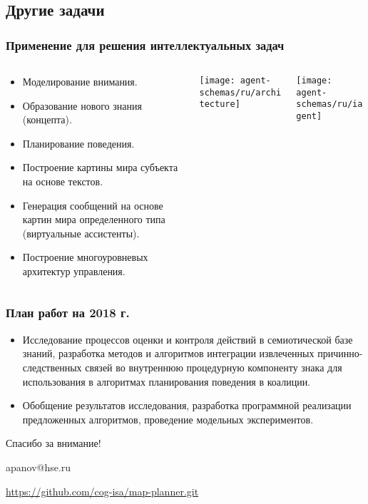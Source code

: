 \documentclass[default]{beamer}
\begin{document}
	\subsection{Другие задачи}
	\begin{frame}
		\frametitle{Применение для решения интеллектуальных задач}
		\vspace{-5pt}
		\footnotesize
		\begin{columns}
			\begin{column}{0.5\textwidth}
				\begin{itemize}
					\item Моделирование внимания.
					\item Образование нового знания (концепта).
					\item Планирование поведения.
					\item Построение картины мира субъекта на основе текстов.
					\item Генерация сообщений на основе картин мира определенного типа (виртуальные ассистенты).
					\item Построение многоуровневых архитектур управления.
				\end{itemize}
				
			\end{column}
			\begin{column}{0.35\textwidth}
				\texttt{[image: agent-schemas/ru/architecture]}
			\end{column}
			\begin{column}{0.15\textwidth}
				\texttt{[image: agent-schemas/ru/iagent]}
			\end{column}
			
		\end{columns}
		\vspace{-5pt}
		\nocite{*}
		\printbibliography[keyword={strl}, resetnumbers=true]
	\end{frame}

	\begin{frame}
		\frametitle{План работ на 2018 г.}
		
		\begin{itemize}
			\item Исследование процессов оценки и контроля действий в семиотической базе знаний, разработка методов и алгоритмов интеграции извлеченных причинно-следственных связей во внутреннюю процедурную компоненту знака для использования в алгоритмах планирования поведения в коалиции. 
			\item Обобщение результатов исследования, разработка программной реализации предложенных алгоритмов, проведение модельных экспериментов.
		\end{itemize}
	\end{frame}

				
	\begin{frame}
		\centering
		\Huge
		Спасибо за внимание!
		\normalsize
		\par\bigskip
		\par\bigskip
		\par\bigskip
		apanov@hse.ru
		\par\bigskip
		\url{https://github.com/cog-isa/map-planner.git}
	\end{frame}			
\end{document}
